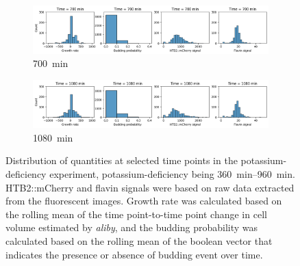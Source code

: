 \begin{figure}
  \begin{subfigure}[htpb]{0.9\textwidth}
   \centering
   \includegraphics[width=\textwidth]{613_distribs_0700}
   \caption{
     \SI{700}{\minute}
   }
   \label{fig:biology-kdeficient-distribs-0700}
  \end{subfigure}

  \begin{subfigure}[htpb]{0.9\textwidth}
   \centering
   \includegraphics[width=\textwidth]{613_distribs_1080}
   \caption{
     \SI{1080}{\minute}
   }
   \label{fig:biology-kdeficient-distribs-1080}
  \end{subfigure}

  \caption{
    Distribution of quantities at selected time points in the potassium-deficiency experiment, potassium-deficiency being \SIrange{360}{960}{\minute}.
    HTB2::mCherry and flavin signals were based on raw data extracted from the fluorescent images.
    Growth rate was calculated based on the rolling mean of the time point-to-time point change in cell volume estimated by \emph{aliby}, and the budding probability was calculated based on the rolling mean of the boolean vector that indicates the presence or absence of budding event over time.
  }
  \label{fig:biology-kdeficient-distribs}
\end{figure}



